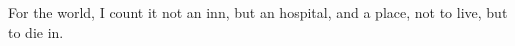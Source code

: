 \documentclass[MAIN]{subfiles}
\begin{document}
For the world, I count it not an inn, but an hospital, and a place, not to live, but to die in.
\end{document}
